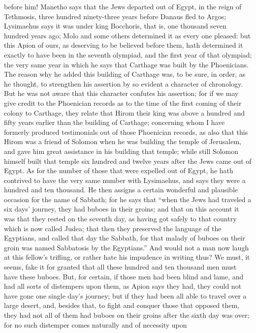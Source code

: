before him! Manetho says that the Jews departed out of Egypt, in the reign
of Tethmosis, three hundred ninety-three years before Danaus fled to
Argos; Lysimaehus says it was under king Bocchoris, that is, one thousand
seven hundred years ago; Molo and some others determined it as every one
pleased: but this Apion of ours, as deserving to be believed before them,
hath determined it exactly to have been in the seventh olympiad, and the
first year of that olympiad; the very same year in which he says that
Carthage was built by the Phoenicians. The reason why he added this
building of Carthage was, to be sure, in order, as he thought, to
strengthen his assertion by so evident a character of chronology. But he
was not aware that this character confutes his assertion; for if we may
give credit to the Phoenician records as to the time of the first coming
of their colony to Carthage, they relate that Hirom their king was above a
hundred and fifty years earlier than the building of Carthage; concerning
whom I have formerly produced testimonials out of those Phoenician
records, as also that this Hirom was a friend of Solomon when he was
building the temple of Jerusalem, and gave him great assistance in his
building that temple; while still Solomon himself built that temple six
hundred and twelve years after the Jews came out of Egypt. As for the
number of those that were expelled out of Egypt, he hath contrived to have
the very same number with Lysimaehus, and says they were a hundred and ten
thousand. He then assigns a certain wonderful and plausible occasion for
the name of Sabbath; for he says that ``when the Jews had traveled a six
days' journey, they had buboes in their groins; and that on this account
it was that they rested on the seventh day, as having got safely to that
country which is now called Judea; that then they preserved the language
of the Egyptians, and called that day the Sabbath, for that malady of
buboes on their groin was named Sabbatosis by the Egyptians.'' And would
not a man now laugh at this fellow's trifling, or rather hate his
impudence in writing thus? We must, it seems, fake it for granted that all
these hundred and ten thousand men must have these buboes. But, for
certain, if those men had been blind and lame, and had all sorts of
distempers upon them, as Apion says they had, they could not have gone one
single day's journey; but if they had been all able to travel over a large
desert, and, besides that, to fight and conquer those that opposed them,
they had not all of them had buboes on their groins after the sixth day
was over; for no such distemper comes naturally and of necessity upon
